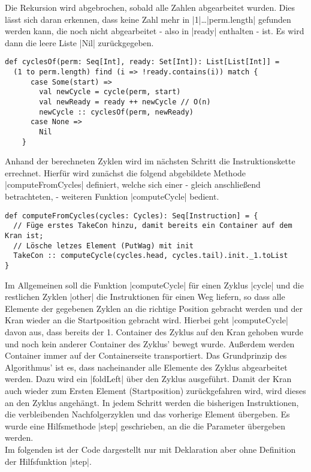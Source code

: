 Die Rekursion wird abgebrochen, sobald alle Zahlen abgearbeitet wurden. Dies lässt sich daran erkennen,
dass keine Zahl mehr in |1|\dots|perm.length| gefunden werden kann, die noch nicht abgearbeitet - also in |ready| enthalten - ist.
Es wird dann die leere Liste |Nil| zurückgegeben.
\lstset{language=Scala}
\lstset{basicstyle=\ttfamily\normalsize}
\begin{lstlisting}
def cyclesOf(perm: Seq[Int], ready: Set[Int]): List[List[Int]] =
  (1 to perm.length) find (i => !ready.contains(i)) match {
      case Some(start) =>
        val newCycle = cycle(perm, start)
        val newReady = ready ++ newCycle // O(n)
        newCycle :: cyclesOf(perm, newReady)
      case None =>
        Nil
    }
\end{lstlisting}
Anhand der berechneten Zyklen wird im nächsten Schritt die Instruktionskette errechnet.
Hierfür wird zunächst die folgend abgebildete Methode |computeFromCycles| definiert,
welche sich einer - gleich anschließend betrachteten, - weiteren Funktion |computeCycle| bedient.
\lstset{basicstyle=\ttfamily\small}
\begin{lstlisting}
def computeFromCycles(cycles: Cycles): Seq[Instruction] = {
  // Füge erstes TakeCon hinzu, damit bereits ein Container auf dem Kran ist;
  // Lösche letzes Element (PutWag) mit init
  TakeCon :: computeCycle(cycles.head, cycles.tail).init._1.toList
}
\end{lstlisting}
Im Allgemeinen soll die Funktion |computeCycle| für einen Zyklus |cycle| und die restlichen Zyklen |other| die Instruktionen für einen Weg liefern,
so dass alle Elemente der gegebenen Zyklen an die richtige Position gebracht werden und der Kran wieder an die Startposition gebracht wird.
Hierbei geht |computeCycle| davon aus, dass bereits der 1. Container des Zyklus auf den Kran gehoben wurde und noch kein anderer Container des Zyklus' bewegt wurde.
Außerdem werden Container immer auf der Containerseite transportiert.
Das Grundprinzip des Algorithmus' ist es, dass nacheinander alle Elemente des Zyklus abgearbeitet werden.
Dazu wird ein |foldLeft| über den Zyklus ausgeführt.
Damit der Kran auch wieder zum Ersten Element (Startposition) zurückgefahren wird, wird dieses an den Zyklus angehängt.
In jedem Schritt werden die bisherigen Instruktionen, die verbleibenden Nachfolgerzyklen und das vorherige Element übergeben.
Es wurde eine Hilfsmethode |step| geschrieben, an die die Parameter übergeben werden. \\
Im folgenden ist der Code dargestellt nur mit Deklaration aber ohne Definition der Hilfsfunktion |step|.
